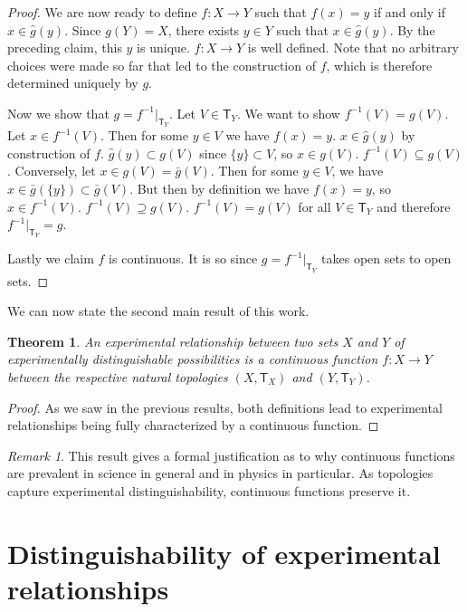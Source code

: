 \documentclass[preprint]{elsarticle}
\theoremstyle{plain}%
\newtheorem{thm}{Theorem}[section]
\theoremstyle{definition}
\theoremstyle{remark}
\newtheorem*{rem}{Remark}
\begin{document}
\begin{proof}
	We are now ready to define $f: X\to Y$ such that $f(x) = y$ if and only if $x\in \hat{g}(y)$. Since $g(Y)=X$, there exists $y\in Y$ such that $x\in\hat{g}(y)$. By the preceding claim, this $y$ is unique. $f: X\to Y$ is well defined. Note that no arbitrary choices were made so far that led to the construction of $f$, which is therefore determined uniquely by $g$. 
	
	Now we show that $g = f^{-1} |_{\mathsf{T}_Y}$. Let $V\in\mathsf{T}_Y$. We want to show $f^{-1}(V) = g(V)$. Let $x\in f^{-1}(V)$. Then for some $y \in V$ we have $f(x)=y$. $x\in \hat{g}(y)$ by construction of $f$. $\hat{g}(y) \subset g(V)$ since $\{y\}\subset V$, so $x\in g(V)$. $f^{-1}(V) \subseteq g(V)$. Conversely, let $x\in g(V)=\bar{g}(V)$. Then for some $y\in V$, we have $x\in\bar{g}(\{y\})\subset\bar{g}(V)$. But then by definition we have $f(x)=y$, so $x\in f^{-1}(V)$. $f^{-1}(V) \supseteq g(V)$. $f^{-1}(V) = g(V)$ for all $V\in\mathsf{T}_Y$ and therefore $f^{-1}|_{\mathsf{T}_Y}=g$.
	
	Lastly we claim $f$ is continuous. It is so since $g = f^{-1} |_{\mathsf{T}_Y}$ takes open sets to open sets. 
\end{proof}

We can now state the second main result of this work.

\begin{thm}
	An experimental relationship between two sets $X$ and $Y$ of experimentally distinguishable possibilities is a continuous function $f : X \rightarrow Y$ between the respective natural topologies $(X,\mathsf{T}_X)$ and $(Y,\mathsf{T}_Y)$. 
\end{thm}

\begin{proof}
	As we saw in the previous results, both definitions lead to experimental relationships being fully characterized by a continuous function.
\end{proof}

\begin{rem}
	This result gives a formal justification as to why continuous functions are prevalent in science in general and in physics in particular. As topologies capture experimental distinguishability, continuous functions preserve it.
\end{rem}


\section{Distinguishability of experimental relationships}
\end{document}
